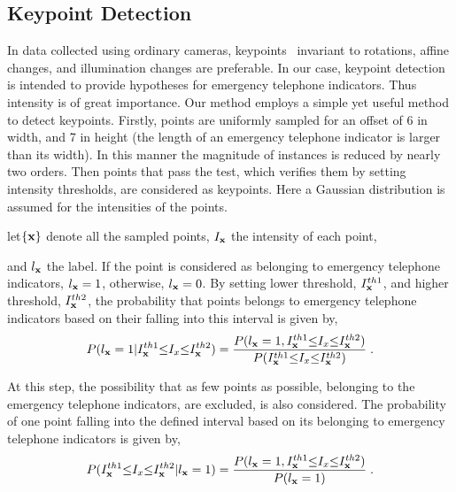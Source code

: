 \documentclass{JoITSRstyle}
\begin{document}
\subsection{Keypoint Detection}
In data collected using ordinary cameras, keypoints~\cite{o2,o12} invariant to rotations, affine changes, and illumination changes are preferable. In our case, keypoint detection is intended to provide hypotheses for emergency telephone indicators. Thus intensity is of great importance. Our method employs a simple yet useful method to detect keypoints. Firstly, points are uniformly sampled for an offset of 6 in width, and 7 in height (the length of an emergency telephone indicator is larger than its width). In this manner the magnitude of instances is reduced by nearly two orders. Then points that pass the test, which verifies them by setting intensity thresholds, are considered as keypoints.
Here a Gaussian distribution is assumed for the intensities of the points.


let$\{\bf{x}\}$ denote all the sampled points, $I_{\bf{x}}$ the intensity of each point, 
and $l_{\bf{x}}$ the label. If the point is considered as belonging to emergency telephone indicators, $l_{\bf{x}}=1$, otherwise, $l_{\bf{x}}=0$. By setting lower threshold, $I^{th1}_{\bf{x}}$,  and higher threshold, $I^{th2}_{\bf{x}}$, the probability that points belongs to emergency telephone indicators based on their falling into this interval is given by,
\begin{equation}
P(l_{\bf{x}}=1|I^{th1}_{\bf{x}}{\leq}I_x{\leq}{I^{th2}_{\bf{x}}})=
\frac
{P(l_{\bf{x}}=1,I^{th1}_{\bf{x}}{\leq}I_x{\leq}{I^{th2}_{\bf{x}}})} {P(I^{th1}_{\bf{x}}{\leq}I_x{\leq}{I^{th2}_{\bf{x}}})}\;.
\label{eq1}
\end{equation}

At this step, the possibility that as few points as possible, belonging to the emergency telephone indicators, are excluded, is also considered. The probability of one point falling into the defined interval based on its belonging to emergency telephone indicators is given by,
\begin{equation}
P(I^{th1}_{\bf{x}}{\leq}I_x{\leq}{I^{th2}_{\bf{x}}}|l_{\bf{x}}=1)=
\frac
{P(l_{\bf{x}}=1,I^{th1}_{\bf{x}}{\leq}I_x{\leq}{I^{th2}_{\bf{x}}})} {P(l_{\bf{x}}=1)}\;.
\label{eq1.1}
\end{equation}
\end{document}
